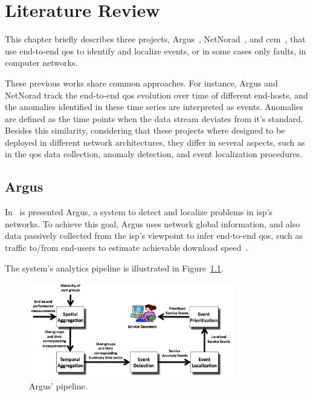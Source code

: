 \chapter{Literature Review}
\label{chap:literature_review}

This chapter briefly describes three projects,
Argus~\cite{argus_end_to_end_service_anomaly_detection_and_localization_from_an_isps_point_of_view},
NetNorad~\cite{netnorad},
and \gls*{cem}~\cite{crowdsourcing_service_level_network_event_monitoring},
that use end-to-end \gls*{qos} to identify and localize events, or in some cases
only faults, in computer networks.

These previous works share common approaches.
For instance, Argus and
NetNorad track the end-to-end \gls*{qos} evolution over time of different
end-hosts,
and the anomalies identified in these time series are interpreted as events.
Anomalies are defined as the time points when the data stream deviates from it's
standard.
Besides this similarity, considering that these projects where designed to be
deployed in different network architectures, they differ in several aspects,
such as in the \gls*{qos} data collection, anomaly detection, and event
localization procedures.

\section{Argus}

In~\cite{argus_end_to_end_service_anomaly_detection_and_localization_from_an_isps_point_of_view}
is presented Argus, a system to
detect and localize problems in \gls*{isp}'s networks. To achieve this goal,
Argus uses network global information, and also data passively collected
from the \gls*{isp}'s viewpoint to infer
end-to-end \gls*{qos}, such as traffic to/from end-users to estimate achievable
download
speed~\cite{speed_testing_without_speed_tests_estimating_achievable_download_speed_from_passive_measurements}.

The system's analytics pipeline is illustrated in
Figure~\ref{fig:argus_pipeline}.

\begin{figure}[H]
    \centering
    \includegraphics[width=0.8\textwidth]{./figures/literature_review/argus_pipeline.png}
    \caption{Argus' pipeline.~\cite{argus_end_to_end_service_anomaly_detection_and_localization_from_an_isps_point_of_view}}
\label{fig:argus_pipeline}
\end{figure}%

